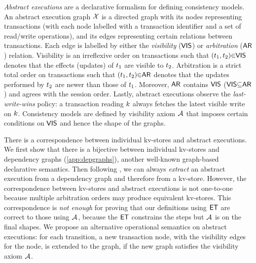 

\emph{Abstract executions} \cite{ev_transactions,framework-concur} are a declarative formalism for defining consistency models. 
An abstract execution graph $\mathcal{X}$ is a directed graph with its nodes representing transactions 
(with each node labelled with a transaction identifier and a set of read/write operations), 
and its edges representing certain relations between transactions. 
Each edge is labelled by either the \emph{visibility} ($\mathsf{VIS}$) or \emph{arbitration} ($\mathsf{AR}$) relation. 
Visibility is an irreflexive order on transactions such that $(t_1,t_2) {\in} \mathsf{VIS}$ denotes that the effects (updates) of $t_1$ are visible to $t_2$. 
Arbitration is a strict total order on transactions such that $(t_1,t_2) {\in} \mathsf{AR}$ denotes that the updates performed by $t_2$ are newer than those of $t_1$. 
Moreover, $\mathsf{AR}$ contains $\mathsf{VIS}$ ($\mathsf{VIS} {\subseteq} \mathsf{AR}$) and agrees with the session order.
Lastly, abstract executions observe the \emph{last-write-wins} policy: 
a transaction reading $k$ always fetches the latest visible write on $k$.
Consistency models are defined by visibility axiom \( \visaxioms\) 
that imposes certain conditions on $\mathsf{VIS}$ and hence the shape of the graphs.

There is a correspondence between individual kv-stores and abstract executions.
We first show that there is a bijective between individual kv-stores and dependency graphs (\cref{app:depgraphs}),
another well-known graph-based declarative semantics.
Then following \cite{laws}, we can always \emph{extract} an abstract execution
from a dependency graph and therefore from a kv-store.
However, the correspondence between kv-stores and abstract executions is not one-to-one 
because multiple arbitration orders may produce equivalent kv-stores.
This correspondence is \emph{not enough} for proving that 
our definitions using \( \mathsf{ET} \) are correct to those using \( \visaxioms \), 
because the \( \mathsf{ET} \) constrains the steps but \( \visaxioms\) is on the final shapes.
We propose an alternative operational semantics on abstract executions:
for each transition, 
a new transaction node, with the visibility edges for the node,
is extended to the graph, if the new graph satisfies the visibility axiom \( \visaxioms \).

